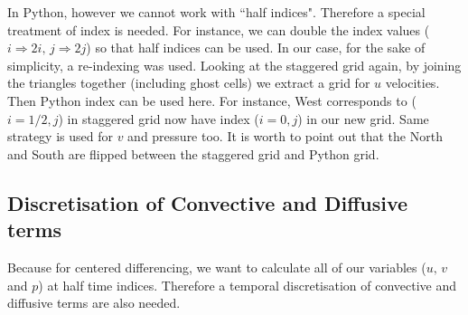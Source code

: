 In Python, however we cannot work with ``half indices". Therefore a special treatment of index is needed. For instance, we can double the index values ($i \Rightarrow 2i,\,j \Rightarrow 2j$) so that half indices can be used. In our case, for the sake of simplicity, a re-indexing was used. Looking at the staggered grid again, by joining the triangles together (including ghost cells) we extract a grid for $u$ velocities. Then Python index can be used here. For instance, West corresponds to ($i=1/2,j$) in staggered grid now have index ($i=0,j$) in our new grid. Same strategy is used for $v$ and pressure too. It is worth to point out that the North and South are flipped between the staggered grid and Python grid.

\subsection{Discretisation of Convective and Diffusive terms}
Because for centered differencing, we want to calculate all of our variables ($u,\,v$ and $p$) at half time indices. Therefore a temporal discretisation of convective and diffusive terms are also needed.\\

